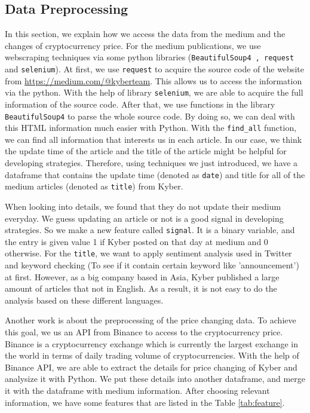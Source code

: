 \documentclass[twoside]{report}
\newcommand{\code}{\texttt}
\begin{document}
\begin{spacing}{1}
\subsection{Data Preprocessing}
In this section, we explain how we access the data from the medium and the changes of cryptocurrency price. For the medium publications, we use webscraping techniques via some python libraries (\code{BeautifulSoup4 , request} and \code{selenium}). At first, we use \code{request} to acquire the source code of the website from \url{https://medium.com/@kyberteam}. This allows us to access the information via the python.  With the help of library \code{selenium}, we are able to acquire the full information of the source code. After that, we use functions in the library \code{BeautifulSoup4} to parse the whole source code. By doing so, we can deal with this HTML information much easier with Python. With the \code{find\_all} function, we can find all information that interests us in each article. In our case, we think the update time of the article and the title of the article might be helpful for developing strategies. Therefore, using techniques we just introduced, we have a dataframe that contains the update time (denoted as \code{date}) and title for all of the medium articles (denoted as \code{title}) from Kyber.

When looking into details, we found that they do not update their medium everyday. We guess updating an article or not is a good signal in developing strategies. So we make a new feature called \code{signal}. It is a binary variable, and the entry is given value 1 if Kyber posted on that day at medium and 0 otherwise.  For the \code{title}, we want to apply sentiment analysis used in Twitter and keyword checking (To see if it contain certain keyword like 'announcement') at first. However, as a big company based in Asia, Kyber published a large amount of articles that not in English. As a result, it is not easy to do the analysis based on these different languages.  




Another work is about the preprocessing of the price changing data. To achieve this goal, we us an API from Binance to access to the cryptocurrency price. Binance is a cryptocurrency exchange which is currently the largest exchange in the world in terms of daily trading volume of cryptocurrencies. With the help of Binance API, we are able to extract the details for price changing of Kyber and analysize it with Python. We put these details into another dataframe, and merge it with the dataframe with medium information. After choosing relevant information, we have some features that are listed in the Table \ref{tab:feature}. 


\end{spacing}
\end{document}
